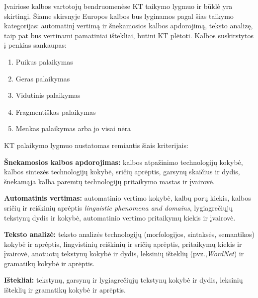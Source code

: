 \begin{multicols}{2}
 Įvairiose kalbos vartotojų bendruomenėse KT taikymo lygmuo ir būklė yra skirtingi. Šiame skirsnyje Europos kalbos bus lyginamos pagal šias taikymo kategorijas: automatinį vertimą ir šnekamosios kalbos apdorojimą, teksto analizę, taip pat bus vertinami pamatiniai ištekliai, būtini KT plėtoti. Kalbos suskirstytos į penkias sankaupas:

\begin{enumerate}
\item Puikus palaikymas
\item Geras palaikymas
\item Vidutinis palaikymas
\item Fragmentiškas palaikymas
\item Menkas palaikymas arba jo visai nėra
\end{enumerate}

KT palaikymo lygmuo nustatomas remiantis šiais kriterijais:

\textbf{Šnekamosios kalbos apdorojimas:} kalbos atpažinimo technologijų kokybė, kalbos sintezės technologijų kokybė, sričių aprėptis, garsynų skaičius ir dydis, šnekamąja kalba paremtų technologijų pritaikymo mastas ir įvairovė.

\textbf{Automatinis vertimas:} automatinio vertimo kokybė, kalbų porų kiekis, kalbos sričių ir reiškinių aprėptis \textit{linguistic phenomena and domains}, lygiagrečiųjų tekstynų dydis ir kokybė, automatinio vertimo pritaikymų kiekis ir įvairovė.

\textbf{Teksto analizė:} teksto analizės technologijų (morfologijos, sintaksės, semantikos) kokybė ir aprėptis, lingvistinių reiškinių ir sričių aprėptis, pritaikymų kiekis ir įvairovė, anotuotų tekstynų kokybė ir dydis, leksinių išteklių (pvz.,\textit{WordNet}) ir gramatikų kokybė ir aprėptis.

\textbf{Ištekliai:} tekstynų, garsynų ir lygiagrečiųjų tekstynų kokybė ir dydis, leksinių išteklių ir gramatikų kokybė ir aprėptis.


\end{multicols}
